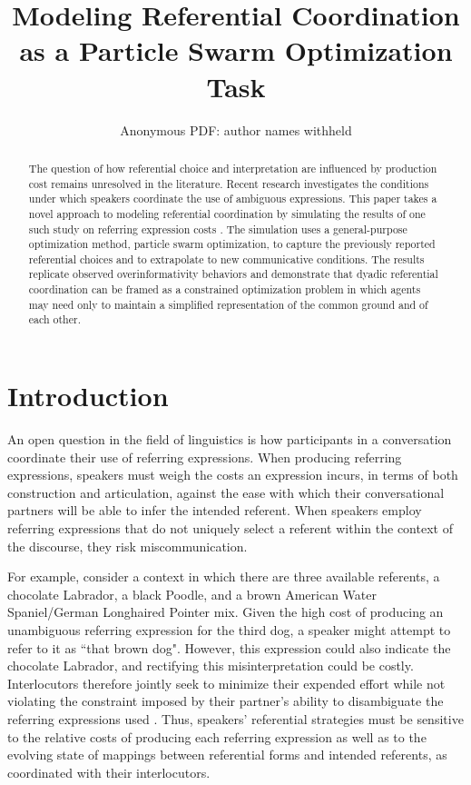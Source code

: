 \documentclass[a4paper,11pt]{article}
\title{Modeling Referential Coordination as a Particle Swarm Optimization Task}
\author{ Anonymous PDF:  author names withheld\\}
\date{}
\begin{document}
\maketitle
\begin{abstract}
The question of how referential choice and interpretation are influenced by production cost remains unresolved in the literature. Recent research \cite{rohde2012,degen2012,frank2012} investigates the conditions under which speakers coordinate the use of ambiguous expressions. This paper takes a novel approach to modeling referential coordination by simulating the results of one such study on referring expression costs \cite{rohde2012}.  The simulation uses a general-purpose optimization method, particle swarm optimization, to capture the previously reported referential choices and to extrapolate to new communicative conditions.  The results replicate observed overinformativity behaviors \cite{brennan1996} and demonstrate that dyadic referential coordination can be framed as a constrained optimization problem in which agents may need only to maintain a simplified representation of the common ground and of each other.
\end{abstract}

\section{Introduction}
An open question in the field of linguistics is how participants in a conversation coordinate their use of referring expressions. When producing referring expressions, speakers must weigh the costs an expression incurs, in terms of both construction and articulation, against the ease with which their conversational partners will be able to infer the intended referent. When speakers employ referring expressions that do not uniquely select a referent within the context of the discourse, they risk miscommunication.

For example, consider a context in which there are three available referents, a chocolate Labrador, a black Poodle, and a brown American Water Spaniel/German Longhaired Pointer mix. Given the high cost of producing an unambiguous referring expression for the third dog, a speaker might attempt to refer to it as ``that brown dog". However, this expression could also indicate the chocolate Labrador, and rectifying this misinterpretation could be costly. Interlocutors therefore jointly seek to minimize their expended effort while not violating the constraint imposed by their partner's ability to disambiguate the referring expressions used \cite{benz2005}. Thus, speakers' referential strategies must be sensitive to the relative costs of producing each referring expression as well as to the evolving state of mappings between referential forms and intended referents, as coordinated with their interlocutors. 
\end{document}

